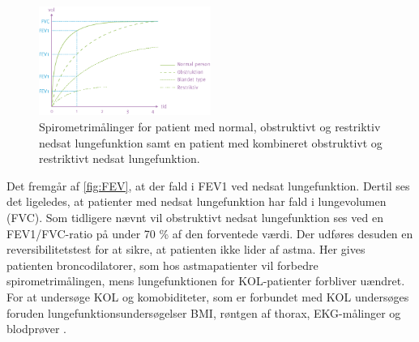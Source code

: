 \begin{figure} [H]
\centering
\includegraphics[width=0.5\textwidth]{figures/FEV}
\caption{Spirometrimålinger for patient med normal, obstruktivt og restriktiv nedsat lungefunktion samt en patient med kombineret obstruktivt og restriktivt nedsat lungefunktion.}
\label{fig:FEV}
\end{figure} 

\noindent
Det fremgår af \autoref{fig:FEV}, at der fald i FEV1 ved nedsat lungefunktion. Dertil ses det ligeledes, at patienter med nedsat lungefunktion har fald i lungevolumen (FVC). Som tidligere nævnt vil obstruktivt nedsat lungefunktion ses ved en FEV1/FVC-ratio på under 70 \% af den forventede værdi. 
Der udføres desuden en reversibilitetstest for at sikre, at patienten ikke lider af astma. Her gives patienten broncodilatorer, som hos astmapatienter vil forbedre spirometrimålingen, mens lungefunktionen for KOL-patienter forbliver uændret.\cite{Basisbogen2016, Sundhed2013} 
For at undersøge KOL og komobiditeter, som er forbundet med KOL undersøges foruden lungefunktionsundersøgelser BMI, røntgen af thorax, EKG-målinger og blodprøver \cite{Sundhed2013}. 
